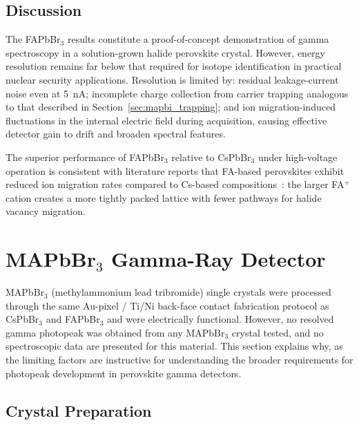 \subsection{Discussion}
\label{sec:fapbbr_discussion}

The FAPbBr$_3$ results constitute a proof-of-concept demonstration
of gamma spectroscopy in a solution-grown halide perovskite crystal.
However, energy resolution remains far below that required for
isotope identification in practical nuclear security applications.
Resolution is limited by: residual leakage-current noise even at
5~nA; incomplete charge collection from carrier trapping analogous
to that described in Section~\ref{sec:mapbi_trapping}; and ion
migration-induced fluctuations in the internal electric field
during acquisition, causing effective detector gain to drift and
broaden spectral features.

The superior performance of FAPbBr$_3$ relative to CsPbBr$_3$
under high-voltage operation is consistent with literature reports
that FA-based perovskites exhibit reduced ion migration rates
compared to Cs-based compositions~\cite{Yuan2016ionmig}: the
larger FA$^+$ cation creates a more tightly packed lattice with
fewer pathways for halide vacancy migration.


\section{MAPbBr$_3$ Gamma-Ray Detector}
\label{sec:mapbbr_issues}

MAPbBr$_3$ (methylammonium lead tribromide) single crystals were
processed through the same Au-pixel / Ti/Ni back-face contact
fabrication protocol as CsPbBr$_3$ and FAPbBr$_3$ and were
electrically functional.  However, no resolved gamma photopeak
was obtained from any MAPbBr$_3$ crystal tested, and no
spectroscopic data are presented for this material.  This section
explains why, as the limiting factors are instructive for
understanding the broader requirements for photopeak development
in perovskite gamma detectors.

\subsection{Crystal Preparation}
\label{sec:mapbbr_fabrication}

